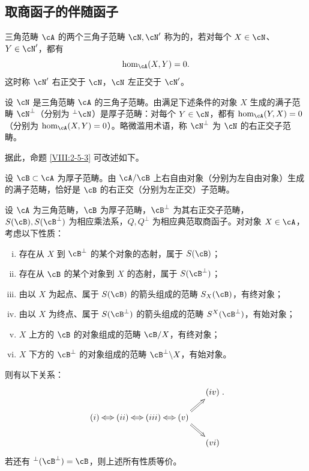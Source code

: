 \subsection{取商函子的伴随函子}\label{VIII:2-6}
\begin{definition}\label{VIII:2-6-1}
三角范畴 $\cA$ 的两个三角子范畴 $\cN,\cN'$ 称为的，若对每个 $X\in\cN$、$Y\in\cN'$，都有
\[\hom_\cA(X,Y)=0.\]
这时称 $\cN'$ 右正交于 $\cN$，$\cN$ 左正交于 $\cN'$。
\end{definition}
\begin{proposition}\label{VIII:2-6-2}
设 $\cN$ 是三角范畴 $\cA$ 的三角子范畴。由满足下述条件的对象 $X$ 生成的满子范畴 $\cN^\bot$（分别为 $^\bot\cN$）是厚子范畴：对每个 $Y\in\cN$，都有 $\hom_\cA(Y,X)=0$（分别为 $\hom_\cA(X,Y)=0$）。略微滥用术语，称 $\cN^\bot$ 为 $\cN$ 的右正交子范畴。
\end{proposition}
据此，命题 \ref{VIII:2-5-3} 可改述如下。
\begin{proposition}\label{VIII:2-6-3}
设 $\cB\subset\cA$ 为厚子范畴。由 $\cA/\cB$ 上右自由对象（分别为左自由对象）生成的满子范畴，恰好是 $\cB$ 的右正交（分别为左正交）子范畴。
\end{proposition}
\begin{proposition}\label{VIII:2-6-4}
设 $\cA$ 为三角范畴，$\cB$ 为厚子范畴，$\cB^\bot$ 为其右正交子范畴，$S(\cB),S(\cB^\bot)$ 为相应乘法系，$Q,Q^\bot$ 为相应典范取商函子。对对象 $X\in\cA$，考虑以下性质：
\begin{enumerate}[(i)]
\item 存在从 $X$ 到 $\cB^\bot$ 的某个对象的态射，属于 $S(\cB)$；
\item 存在从 $\cB$ 的某个对象到 $X$ 的态射，属于 $S(\cB^\bot)$；
\item 由以 $X$ 为起点、属于 $S(\cB)$ 的箭头组成的范畴 $S_X(\cB)$，有终对象；
\item 由以 $X$ 为终点、属于 $S(\cB^\bot)$ 的箭头组成的范畴 $S^X(\cB^\bot)$，有始对象；
\item $X$ 上方的 $\cB$ 的对象组成的范畴 $\cB/X$，有终对象；
\item $X$ 下方的 $\cB^\bot$ 的对象组成的范畴 $\cB^\bot\backslash X$，有始对象。
\end{enumerate}
则有以下关系：
\[\xymatrix@=0.5cm{
&&&&(iv)\\
(i)\ar@{<=>}[r]&(ii)\ar@{<=>}[r]&(iii)\ar@{<=>}[r]&(v)\ar@{=>}[ur]\ar@{=>}[dr]\\
&&&&(vi)}.\]
若还有 $^\bot(\cB^\bot)=\cB$，则上述所有性质等价。
\end{proposition}
